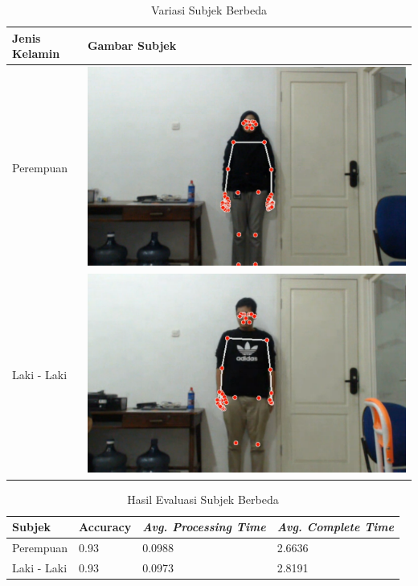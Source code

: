 \begin{table}[H]
  \caption{Variasi Subjek Berbeda}
  \label{tb:kondisisubjek}
  \centering
  \begin{tabular}{ll}
    \hline
    \textbf{Jenis Kelamin} & \textbf{Gambar Subjek} \\
    \hline
    Perempuan & \includegraphics[scale=0.12]{gambar/bab4-rani.png} \\
    \hline
    Laki - Laki & \includegraphics[scale=0.12]{gambar/bab4-evan.png} \\
    \hline
  \end{tabular}
\end{table}

\begin{table}[H]
  \caption{Hasil Evaluasi Subjek Berbeda}
  \label{tb:evaluasiSubjek}
  \centering
  \begin{tabular}{llll}
    \hline
    \textbf{Subjek} & \textbf{Accuracy} & \emph{\textbf{Avg. Processing Time}} & \emph{\textbf{Avg. Complete Time}} \\
    \hline
    Perempuan & 0.93 & 0.0988 & 2.6636 \\
    Laki - Laki & 0.93 & 0.0973 & 2.8191 \\
    \hline
  \end{tabular}
\end{table}

